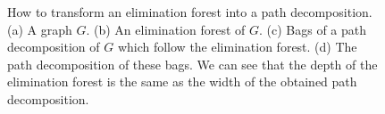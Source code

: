 \begin{figure}
    \begin{subfigure}[b]{0.36\textwidth}
        \caption{}
    \end{subfigure}
    \begin{subfigure}[b]{0.24\textwidth}
        \caption{}
    \end{subfigure}
    \begin{subfigure}[b]{0.25\textwidth}
        \caption{}
    \end{subfigure}
    \begin{subfigure}[b]{0.13\textwidth}
        \caption{}
    \end{subfigure}

    \caption{How to transform an elimination forest into a path decomposition. (a) A graph $G$. (b) An elimination forest of $G$. (c) Bags of a path decomposition of $G$ which follow the elimination forest. (d) The path decomposition of these bags. We can see that the depth of the elimination forest is the same as the width of the obtained path decomposition.}
    \label{fig:treedepth-to-pathwidth}
\end{figure}